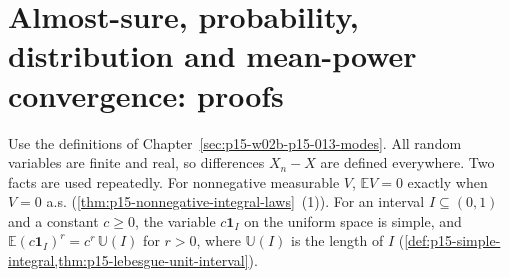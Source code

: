 \section{Almost-sure, probability, distribution and mean-power convergence: proofs}
\label{sec:annex-p15-w02b-p15-013-modes}

Use the definitions of Chapter~\ref{sec:p15-w02b-p15-013-modes}. All
random variables are finite and real, so differences \(X_n-X\) are
defined everywhere. Two facts are used repeatedly. For nonnegative
measurable \(V\), \(\mathbb EV=0\) exactly when \(V=0\) a.s.
(\cref{thm:p15-nonnegative-integral-laws}~(1)). For an interval
\(I\subseteq(0,1)\) and a constant \(c\geq0\), the variable
\(c\mathbf1_I\) on the uniform space is simple, and
\(\mathbb E(c\mathbf1_I)^r=c^r\,\mathbb U(I)\) for \(r>0\), where
\(\mathbb U(I)\) is the length of \(I\)
(\cref{def:p15-simple-integral,thm:p15-lebesgue-unit-interval}).

